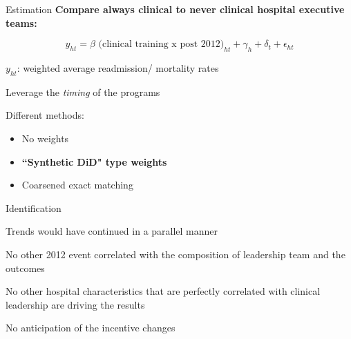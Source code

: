 \documentclass[notes,11pt, aspectratio=169]{beamer}
\newenvironment{wideitemize}{\itemize\addtolength{\itemsep}{10pt}}{\enditemize}
\begin{document}
\begin{frame}{Estimation}\label{est_equation}
    \textbf{Compare always clinical to never clinical hospital executive teams:}

    \vspace{3mm}\large
    \begin{equation*}
    y_{ht} = \beta \text{ (clinical training x post 2012)}_{ht} + \gamma_{h} + \delta_t + \epsilon_{ht}
    \end{equation*}

    \vspace{5mm}
    \normalsize
    \begin{wideitemize}
        \item $y_{ht}$: weighted average readmission/ mortality rates
        \item Leverage the \textit{timing} of the programs
    \end{wideitemize}

    \vspace{5mm}

    Different methods:
    \begin{itemize}
        \item No weights
        \item \textbf{``Synthetic DiD" type weights} \hyperlink{synthdid_equation}{}
        \item Coarsened exact matching \hyperlink{match_equation}{}
    \end{itemize}
\end{frame}

\begin{frame}{Identification}
\begin{wideitemize}
    \item Trends would have continued in a parallel manner
    \item No other 2012 event correlated with the composition of leadership team and the outcomes
    \item No other hospital characteristics that are perfectly correlated with clinical leadership are driving the results
    \item No anticipation of the incentive changes
\end{wideitemize}
\end{frame}
\end{document}
